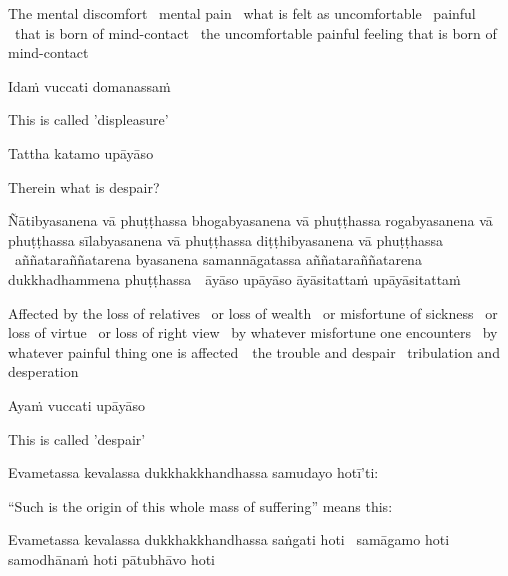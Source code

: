 \begin{english-hang-verses}
  The mental discomfort \breathmark\ mental pain \breathmark\ what is felt as uncomfortable \breathmark\ painful \breathmark\ that is born of mind-contact \breathmark\ the uncomfortable painful feeling that is born of mind-contact
\end{english-hang-verses}

Idaṁ vuccati domanassaṁ

\begin{english}
  This is called 'displeasure'
\end{english}

Tattha katamo upāyāso

\begin{english}
  Therein what is despair?
\end{english}

\begin{pali-hang}
  Ñātibyasanena vā phuṭṭhassa bhogabyasanena vā phuṭṭhassa rogabyasanena vā phuṭṭhassa sīlabyasanena vā phuṭṭhassa diṭṭhibyasanena vā phuṭṭhassa \breathmark\ aññataraññatarena byasanena samannāgatassa aññataraññatarena dukkhadhammena \mbox{phuṭṭhassa}~\breathmark\ āyāso upāyāso āyāsitattaṁ upāyāsitattaṁ
\end{pali-hang}

\begin{english-hang-verses}
  Affected by the loss of relatives \breathmark\ or loss of wealth \breathmark\ or misfortune of sickness \breathmark\ or loss of virtue \breathmark\ or loss of right view \breathmark\ by whatever misfortune one encounters \breathmark\ by whatever painful thing one is \mbox{affected}~\breathmark\ the trouble and despair \breathmark\ tribulation and desperation
\end{english-hang-verses}

Ayaṁ vuccati upāyāso

\begin{english}
  This is called 'despair'
\end{english}

Evametassa kevalassa dukkhakkhandhassa samudayo hotī'ti:

\begin{english}
  ``Such is the origin of this whole mass of suffering'' means this:
\end{english}

\begin{pali-hang}
  Evametassa kevalassa dukkhakkhandhassa saṅgati hoti \breathmark\ samāgamo hoti samodhānaṁ hoti pātubhāvo hoti
\end{pali-hang}

